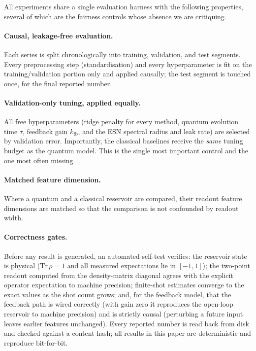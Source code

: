 \documentclass[11pt,a4paper]{article}
\begin{document}
All experiments share a single evaluation harness with the following
properties, several of which are the fairness controls whose absence we are
critiquing.

\paragraph{Causal, leakage-free evaluation.} Each series is split
chronologically into training, validation, and test segments. Every
preprocessing step (standardisation) and every hyperparameter is fit on the
training/validation portion only and applied causally; the test segment is
touched once, for the final reported number.

\paragraph{Validation-only tuning, applied equally.} All free
hyperparameters (ridge penalty for every method, quantum evolution time
$\tau$, feedback gain $k_{\mathrm{fb}}$, and the ESN spectral radius and leak
rate) are selected by validation error. Importantly, the classical baselines
receive the \emph{same} tuning budget as the quantum model. This is the single
most important control and the one most often missing.

\paragraph{Matched feature dimension.} Where a quantum and a classical reservoir
are compared, their readout feature dimensions are matched so that the
comparison is not confounded by readout width.

\paragraph{Correctness gates.} Before any result is generated, an automated
self-test verifies: the reservoir state is physical ($\mathrm{Tr}\,\rho=1$ and
all measured expectations lie in $[-1,1]$); the two-point readout computed from
the density-matrix diagonal agrees with the explicit operator expectation to
machine precision; finite-shot estimates converge to the exact values as the
shot count grows; and, for the feedback model, that the feedback path is wired
correctly (with gain zero it reproduces the open-loop reservoir to machine
precision) and is strictly causal (perturbing a future input leaves earlier
features unchanged). Every reported number is read back from disk and checked
against a content hash; all results in this paper are deterministic and
reproduce bit-for-bit.
\end{document}
